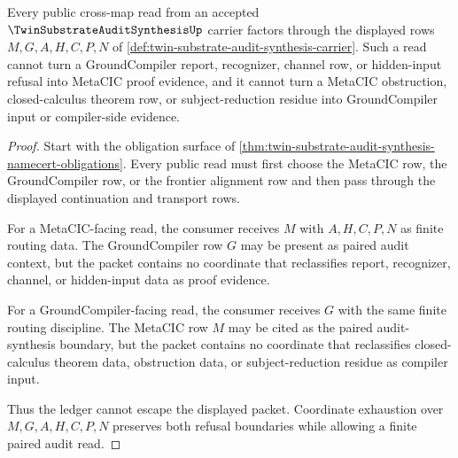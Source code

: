 \begin{theorem}
\label{thm:twin-substrate-audit-synthesis-cross-map-nonescape}
Every public cross-map read from an accepted $\TwinSubstrateAuditSynthesisUp$ carrier factors through the displayed rows $M,G,A,H,C,P,N$ of \autoref{def:twin-substrate-audit-synthesis-carrier}. Such a read cannot turn a GroundCompiler report, recognizer, channel row, or hidden-input refusal into MetaCIC proof evidence, and it cannot turn a MetaCIC obstruction, closed-calculus theorem row, or subject-reduction residue into GroundCompiler input or compiler-side evidence.
\end{theorem}
\begin{proof}
Start with the obligation surface of \autoref{thm:twin-substrate-audit-synthesis-namecert-obligations}. Every public read must first choose the MetaCIC row, the GroundCompiler row, or the frontier alignment row and then pass through the displayed continuation and transport rows.

For a MetaCIC-facing read, the consumer receives $M$ with $A,H,C,P,N$ as finite routing data. The GroundCompiler row $G$ may be present as paired audit context, but the packet contains no coordinate that reclassifies report, recognizer, channel, or hidden-input data as proof evidence.

For a GroundCompiler-facing read, the consumer receives $G$ with the same finite routing discipline. The MetaCIC row $M$ may be cited as the paired audit-synthesis boundary, but the packet contains no coordinate that reclassifies closed-calculus theorem data, obstruction data, or subject-reduction residue as compiler input.

Thus the ledger cannot escape the displayed packet. Coordinate exhaustion over $M,G,A,H,C,P,N$ preserves both refusal boundaries while allowing a finite paired audit read.
\end{proof}


